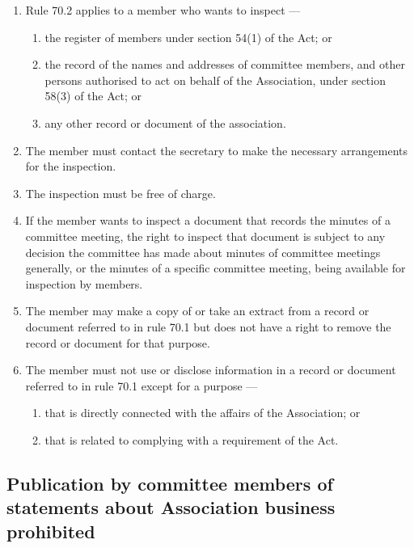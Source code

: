 \documentclass[../constitution.tex]{subfiles}
\begin{document}
\begin{enumerate}

\item Rule 70.2 applies to a member who wants to inspect ---

  \begin{enumerate}
  
  \item the register of members under section 54(1) of the Act; or
  \item the record of the names and addresses of committee members, and other persons authorised to act on behalf of the Association, under section 58(3) of the Act; or
  \item any other record or document of the association.
  \end{enumerate}
\item The member must contact the secretary to make the necessary arrangements for the inspection.
\item The inspection must be free of charge.
\item If the member wants to inspect a document that records the minutes of a committee meeting, the right to inspect that document is subject to any decision the committee has made about minutes of committee meetings generally, or the minutes of a specific committee meeting, being available for inspection by members.
\item The member may make a copy of or take an extract from a record or document referred to in rule 70.1 but does not have a right to remove the record or document for that purpose.
\item The member must not use or disclose information in a record or document referred to in rule 70.1 except for a purpose ---

  \begin{enumerate}
  
  \item that is directly connected with the affairs of the Association; or
  \item that is related to complying with a requirement of the Act.
  \end{enumerate}
\end{enumerate}

\hypertarget{publication-by-committee-members-of-statements-about-association-business-prohibited}{%
\subsection{Publication by committee members of statements about Association business prohibited}\label{publication-by-committee-members-of-statements-about-association-business-prohibited}}
\end{document}
